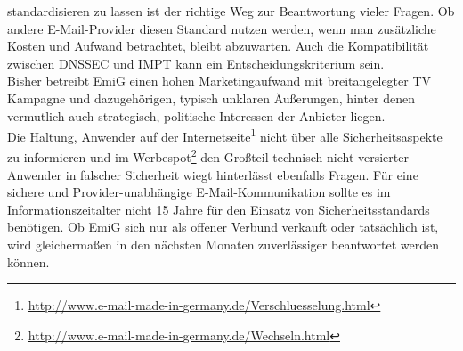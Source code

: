 \documentclass  [paper=a4,
				fontsize=12pt,
				listof=totoc,
				bibliography=totoc
				]{scrreprt}
\begin{document}
			standardisieren zu lassen ist der richtige Weg zur Beantwortung vieler Fragen.
			Ob andere E-Mail-Provider diesen Standard nutzen werden, wenn man zusätzliche Kosten und Aufwand betrachtet, bleibt abzuwarten. Auch die Kompatibilität zwischen \ac{DNSSEC} und \ac{IMPT} kann ein Entscheidungskriterium sein.
			\medskip\\
			Bisher betreibt \ac{EmiG} einen hohen Marketingaufwand mit breitangelegter TV Kampagne und dazugehörigen, typisch unklaren Äußerungen, hinter denen vermutlich auch strategisch, politische Interessen der Anbieter liegen.\\
			Die Haltung, Anwender auf der Internetseite\footnote{\url{http://www.e-mail-made-in-germany.de/Verschluesselung.html}} 
			nicht über alle Sicherheitsaspekte zu informieren und im Werbespot\footnote{\url{http://www.e-mail-made-in-germany.de/Wechseln.html}} den Großteil technisch nicht versierter Anwender in falscher Sicherheit wiegt hinterlässt ebenfalls Fragen.
			Für eine sichere und Provider-unabhängige E-Mail-Kommunikation sollte es im Informationszeitalter nicht 15 Jahre für den Einsatz von Sicherheitsstandards benötigen.
			Ob \ac{EmiG} sich nur als offener Verbund verkauft oder tatsächlich ist, wird gleichermaßen in den nächsten Monaten zuverlässiger beantwortet werden können.
			
%			
\end{document}
